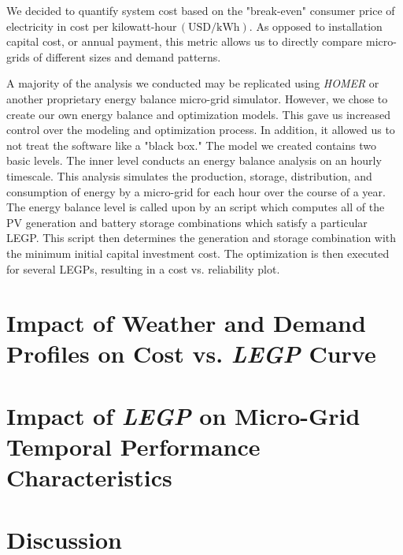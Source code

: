 \documentclass{article}
\newcommand{\unit}[1]{\ensuremath{\, \mathrm{#1}}}
\begin{document}
We decided to quantify system cost based on the "break-even" consumer price of electricity in cost per kilowatt-hour\unit{(USD/kWh)}. 
As opposed to installation capital cost, or annual payment, this metric allows us to directly compare micro-grids of different sizes and demand patterns. 



A majority of the analysis we conducted may be replicated using \emph{HOMER} or another proprietary energy balance micro-grid simulator. 
However, we chose to create our own energy balance and optimization models.
This gave us increased control over the modeling and optimization process. 
In addition, it allowed us to not treat the software like a "black box."
The model we created contains two basic levels.
The inner level conducts an energy balance analysis on an hourly timescale.
This analysis simulates the production, storage, distribution, and consumption of energy by a micro-grid for each hour over the course of a year. 
The energy balance level is called upon by an script which computes all of the PV generation and battery storage combinations which satisfy a particular LEGP. 
This script then determines the generation and storage combination with the minimum initial capital investment cost. 
The optimization is then executed for several LEGPs, resulting in a cost vs. reliability plot.

\section{Impact of Weather and Demand Profiles on Cost vs. \emph{LEGP} Curve}
\section{Impact of \emph{LEGP} on Micro-Grid Temporal Performance Characteristics}
\section{Discussion}
\end{document}
